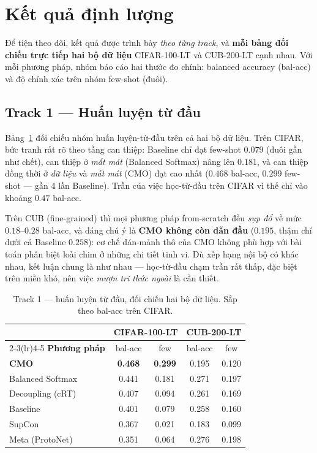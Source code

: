 \section{Kết quả định lượng}

Để tiện theo dõi, kết quả được trình bày \emph{theo từng track}, và \textbf{mỗi bảng đối chiếu trực
tiếp hai bộ dữ liệu} CIFAR-100-LT và CUB-200-LT cạnh nhau. Với mỗi phương pháp, nhóm báo cáo hai
thước đo chính: balanced accuracy (bal-acc) và độ chính xác trên nhóm few-shot (đuôi).

\subsection{Track 1 --- Huấn luyện từ đầu}

Bảng~\ref{tab:scratch} đối chiếu nhóm huấn luyện-từ-đầu trên cả hai bộ dữ liệu. Trên CIFAR, bức
tranh rất rõ theo tầng can thiệp: Baseline chỉ đạt few-shot $0.079$ (đuôi gần như chết), can thiệp ở
\emph{mất mát} (Balanced Softmax) nâng lên $0.181$, và can thiệp đồng thời ở \emph{dữ liệu} và
\emph{mất mát} (CMO) đạt cao nhất ($0.468$ bal-acc, $0.299$ few-shot --- gần 4 lần Baseline). Trần
của việc học-từ-đầu trên CIFAR vì thế chỉ vào khoảng $0.47$ bal-acc.

Trên CUB (fine-grained) thì mọi phương pháp from-scratch đều \emph{sụp đổ} về mức $0.18$--$0.28$
bal-acc, và đáng chú ý là \textbf{CMO không còn dẫn đầu} ($0.195$, thậm chí dưới cả Baseline
$0.258$): cơ chế dán-mảnh thô của CMO không phù hợp với bài toán phân biệt loài chim ở những chi
tiết tinh vi. Dù xếp hạng nội bộ có khác nhau, kết luận chung là như nhau --- học-từ-đầu chạm trần
rất thấp, đặc biệt trên miền khó, nên việc \emph{mượn tri thức ngoài} là cần thiết.

\begin{table}[H]
\centering
\caption{Track 1 --- huấn luyện từ đầu, đối chiếu hai bộ dữ liệu. Sắp theo bal-acc trên CIFAR.}
\label{tab:scratch}
\begin{tabular}{lcccc}
\toprule
 & \multicolumn{2}{c}{\textbf{CIFAR-100-LT}} & \multicolumn{2}{c}{\textbf{CUB-200-LT}} \\
\cmidrule(lr){2-3}\cmidrule(lr){4-5}
\textbf{Phương pháp} & bal-acc & few & bal-acc & few \\
\midrule
\textbf{CMO} & \textbf{0.468} & \textbf{0.299} & 0.195 & 0.120 \\
Balanced Softmax & 0.441 & 0.181 & 0.271 & 0.197 \\
Decoupling (cRT) & 0.407 & 0.094 & 0.261 & 0.169 \\
Baseline & 0.401 & 0.079 & 0.258 & 0.160 \\
SupCon & 0.367 & 0.021 & 0.183 & 0.099 \\
Meta (ProtoNet) & 0.351 & 0.064 & 0.276 & 0.198 \\
\bottomrule
\end{tabular}
\end{table}


